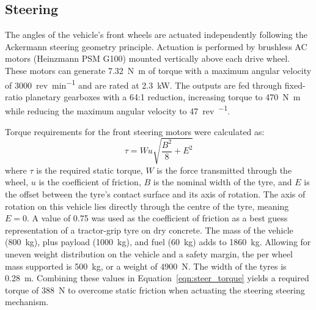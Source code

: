 \documentclass[preprint,authoryear,12pt]{elsarticle}
\begin{document}
    \subsection{Steering}
    \label{sub:steering}

        The angles of the vehicle's front wheels are actuated independently following the Ackermann steering geometry principle.
        Actuation is performed by brushless AC motors (Heinzmann PSM G100) mounted vertically above each drive wheel.
        These motors can generate \SI{7.32}{\newton\meter} of torque with a maximum angular velocity of \SI{3000}{rev\per\minute} and are rated at \SI{2.3}{\kilo\watt}.
        The outputs are fed through fixed-ratio planetary gearboxes with a 64:1 reduction, increasing torque to \SI{470}{\newton\meter} while reducing the maximum angular velocity to \SI{47}{rev\per\min}.

        Torque requirements for the front steering motors were calculated as:
        \begin{equation}
        \label{eqn:steer_torque}
        \tau = W u \sqrt{\frac{B^2}{8} + E^2}
        \end{equation}
        where $\tau$ is the required static torque, $W$ is the force transmitted through the wheel, $u$ is the coefficient of friction, $B$ is the nominal width of the tyre, and $E$ is the offset between the tyre's contact surface and its axis of rotation.
        The axis of rotation on this vehicle lies directly through the centre of the tyre, meaning $E=0$.
        A value of 0.75 was used as the coefficient of friction as a best guess representation of a tractor-grip tyre on dry concrete.
        The mass of the vehicle (\SI{800}{\kilo\gram}), plus payload (\SI{1000}{\kilo\gram}), and fuel (\SI{60}{\kilo\gram}) adds to \SI{1860}{\kilo\gram}.
        Allowing for uneven weight distribution on the vehicle and a safety margin, the per wheel mass supported is \SI{500}{\kilo\gram}, or a weight of \SI{4900}{\newton}.
        The width of the tyres is \SI{0.28}{\meter}.
        Combining these values in Equation~\ref{eqn:steer_torque} yields a required torque of \SI{388}{\newton} to overcome static friction when actuating the steering steering mechanism.
\end{document}
